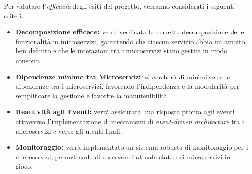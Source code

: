 Per valutare l'\emph{efficacia} degli esiti del progetto, verranno considerati i seguenti criteri:

\begin{itemize}

    \item \textbf{Decomposizione efficace:} verrà verificata la corretta decomposizione delle funzionalità in microservizi, garantendo che ciascun servizio abbia un ambito ben definito e che le interazioni tra i microservizi siano gestite in modo consono.

    \item \textbf{Dipendenze minime tra Microservizi:} si cercherà di minimizzare le dipendenze tra i microservizi, favorendo l'indipendenza e la modularità per semplificare la gestione e favorire la manutenibilità.

    \item \textbf{Reattività agli Eventi:} verrà assicurata una risposta pronta agli eventi attraverso l'implementazione di meccanismi di \emph{event-driven architecture} tra i microservizi e verso gli utenti finali.


    \item \textbf{Monitoraggio:} verrà implementato un sistema robusto di monitoraggio per i microservizi, permettendo di osservare l'attuale stato dei microservizi in gioco.
    

\end{itemize}
